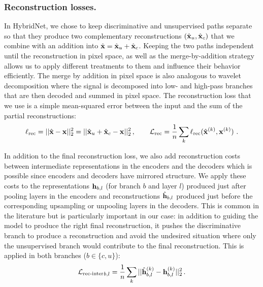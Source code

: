 \documentclass[runningheads]{llncs}
\begin{document}
\subsubsection{Reconstruction losses.}

In HybridNet, we chose to keep discriminative and unsupervised paths separate so that they produce two complementary reconstructions $(\hat{\mathbf{x}}_u, \hat{\mathbf{x}}_c)$ that we combine with an addition into $\hat{\mathbf{x}} = \hat{\mathbf{x}}_u + \hat{\mathbf{x}}_c$. Keeping the two paths independent until the reconstruction in pixel space, as well as the merge-by-addition strategy allows us to apply different treatments to them and influence their behavior efficiently. The merge by addition in pixel space is also analogous to wavelet decomposition where the signal is decomposed into low- and high-pass branches that are then decoded and summed in pixel space. The reconstruction loss that we use is a simple mean-squared error between the input and the sum of the partial reconstructions:
\begin{equation}
	\ell_\mathrm{rec} = ||\hat{\mathbf{x}} - \mathbf{x}||_2^2 = ||\hat{\mathbf{x}}_u + \hat{\mathbf{x}}_c - \mathbf{x}||_2^2\,, \qquad \mathcal L_\textrm{rec}=\frac{1}{n} \sum_k \ell_\mathrm{rec}(\hat{\mathbf{x}}^{(k)}, \mathbf{x}^{(k)}) \ .
\end{equation}

In addition to the final reconstruction loss, we also add reconstruction costs between intermediate representations in the encoders and the decoders which is possible since encoders and decoders have mirrored structure. We apply these costs to the representations $\mathbf{h}_{b,l}$ (for branch $b$ and layer $l$) produced just after pooling layers in the encoders and reconstructions $\hat{\mathbf{h}}_{b,l}$ produced just before the corresponding upsampling or unpooling layers in the decoders. This is common in the literature \cite{Zhao2016a,Zhang2016a,Rasmus2015} but is particularly important in our case: in addition to guiding the model to produce the right final reconstruction, it pushes the discriminative branch to produce a reconstruction and avoid the undesired situation where only the unsupervised branch would contribute to the final reconstruction. This is applied in both branches ($b \in \{c,u\}$):
\begin{equation}
	{\mathcal L_\textrm{rec-inter}}_{b,l} = \frac{1}{n} \sum_k ||\hat{\mathbf{h}}_{b,l}^{(k)} - \mathbf{h}_{b,l}^{(k)}||_2^2\,.
\end{equation}
\end{document}
